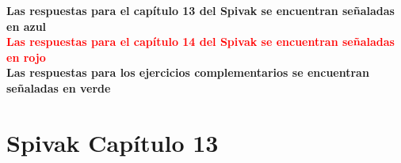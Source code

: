\documentclass{report}
\begin{document}

    \textbf{\textcolor{NavyBlue}{Las respuestas para el capítulo 13 del Spivak se encuentran señaladas en azul}}\\
    \textbf{\textcolor{Red}{Las respuestas para el capítulo 14 del Spivak se encuentran señaladas en rojo}}\\
    \textbf{\textcolor{OliveGreen}{Las respuestas para los ejercicios complementarios se encuentran señaladas en verde}}\\

    \section*{\textcolor{NavyBlue}{Spivak Capítulo 13}}
\end{document}
